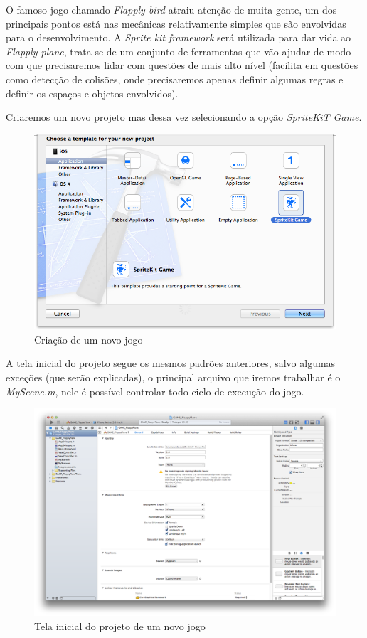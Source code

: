 \documentclass[a4paper,12pt,brazil,oneside]{book}
\begin{document}
O famoso jogo chamado \emph{Flapply bird} atraiu atenção de muita gente, um dos principais pontos está nas mecânicas relativamente simples que são envolvidas para o desenvolvimento.
A \emph{Sprite kit framework} será utilizada para dar vida ao \emph{Flapply plane}, trata-se de um conjunto de ferramentas que vão ajudar de modo com que precisaremos lidar com questões de mais alto nível (facilita em questões como detecção de colisões, onde precisaremos apenas definir algumas regras e definir os espaços e objetos envolvidos).

Criaremos um novo projeto mas dessa vez selecionando a opção \emph{SpriteKiT Game}.

\begin{figure}[H]
  \centering
  \includegraphics[width=1\textwidth]{figuras/6/plane1.png}
  \caption{Criação de um novo jogo}
  \label{fig:a}
\end{figure}

A tela inicial do projeto segue os mesmos padrões anteriores, salvo algumas exceções (que serão explicadas), o principal arquivo que iremos trabalhar é o \emph{MyScene.m}, nele é possível controlar todo ciclo de execução do jogo.

\begin{figure}[H]
  \centering
  \includegraphics[width=1\textwidth]{figuras/6/plane2.png}
  \caption{Tela inicial do projeto de um novo jogo}
  \label{fig:a}
\end{figure}
\end{document}
